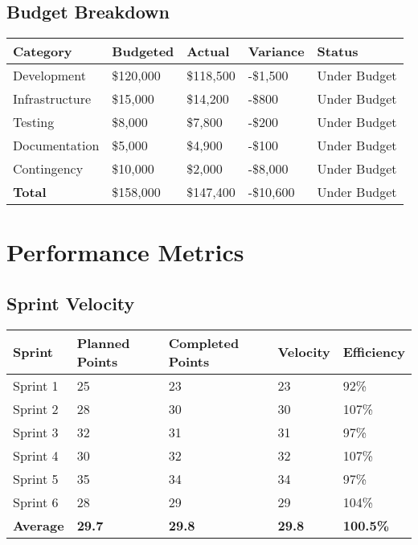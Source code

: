 \documentclass[12pt,a4paper]{article}
\begin{document}
\subsection{Budget Breakdown}
\begin{longtable}{|p{3cm}|p{3cm}|p{3cm}|p{3cm}|p{2cm}|}
\hline
\rowcolor{lightgray}
\textbf{Category} & \textbf{Budgeted} & \textbf{Actual} & \textbf{Variance} & \textbf{Status} \\
\hline
Development & \$120,000 & \$118,500 & -\$1,500 & \cellcolor{completedgreen}Under Budget \\
\hline
Infrastructure & \$15,000 & \$14,200 & -\$800 & \cellcolor{completedgreen}Under Budget \\
\hline
Testing & \$8,000 & \$7,800 & -\$200 & \cellcolor{completedgreen}Under Budget \\
\hline
Documentation & \$5,000 & \$4,900 & -\$100 & \cellcolor{completedgreen}Under Budget \\
\hline
Contingency & \$10,000 & \$2,000 & -\$8,000 & \cellcolor{completedgreen}Under Budget \\
\hline
\textbf{Total} & \$158,000 & \$147,400 & -\$10,600 & \cellcolor{completedgreen}Under Budget \\
\hline
\end{longtable}

\section{Performance Metrics}

\subsection{Sprint Velocity}
\begin{longtable}{|p{2cm}|p{3cm}|p{3cm}|p{3cm}|p{2cm}|}
\hline
\rowcolor{lightgray}
\textbf{Sprint} & \textbf{Planned Points} & \textbf{Completed Points} & \textbf{Velocity} & \textbf{Efficiency} \\
\hline
Sprint 1 & 25 & 23 & 23 & 92\% \\
\hline
Sprint 2 & 28 & 30 & 30 & 107\% \\
\hline
Sprint 3 & 32 & 31 & 31 & 97\% \\
\hline
Sprint 4 & 30 & 32 & 32 & 107\% \\
\hline
Sprint 5 & 35 & 34 & 34 & 97\% \\
\hline
Sprint 6 & 28 & 29 & 29 & 104\% \\
\hline
\textbf{Average} & \textbf{29.7} & \textbf{29.8} & \textbf{29.8} & \textbf{100.5\%} \\
\hline
\end{longtable}
\end{document}
